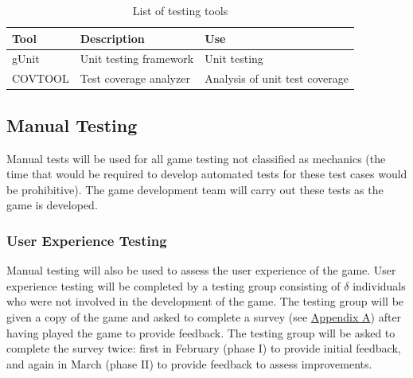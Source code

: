 \documentclass[12pt, titlepage]{article}
\begin{document}
\begin{table}[ht]
\caption{List of testing tools} \label{tab:tools}
\begin{tabularx}{\textwidth}{p{2.3cm}p{4.5cm}X}
\toprule {\bf Tool} & {\bf Description} & {\bf Use}\\
\midrule
gUnit & Unit testing framework & Unit testing\\
COVTOOL & Test coverage analyzer & Analysis of unit test coverage\\
\bottomrule
\end{tabularx}
\end{table}

\subsection{Manual Testing}
Manual tests will be used for all game testing not classified as mechanics (the time that would be required to develop automated tests for these test cases would be prohibitive).  The game development team will carry out these tests as the game is developed.

\subsubsection{User Experience Testing}
\label{sec:userexp}
Manual testing will also be used to assess the user experience of the game.  User experience testing will be completed by a testing group consisting of $\hyperref[tab:constants]{\delta}$ individuals who were not involved in the development of the game.  The testing group will be given a copy of the game and asked to complete a survey (see \hyperref[sec:survey]{Appendix A}) after having played the game to provide feedback.  The testing group will be asked to complete the survey twice:  first in February (phase I) to provide initial feedback, and again in March (phase II) to provide feedback to assess improvements.
\end{document}
